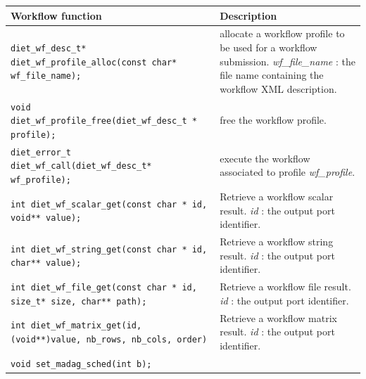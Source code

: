 \begin{table}[htbp]
  \centering
  \begin{tabular}[htbp]{|p{8cm}|p{7.5cm}|}\hline
    Workflow function & Description \\\hline
    \texttt{diet\_wf\_desc\_t*  \newline
      diet\_wf\_profile\_alloc(const char* wf\_file\_name);} 
    &
    allocate a workflow profile to be used for a workflow submission.\newline
    \textit{wf\_file\_name} : the file name containing the workflow XML description.
    \\\hline
    \texttt{void  \newline
      diet\_wf\_profile\_free(diet\_wf\_desc\_t * profile);} 
    &
    free the workflow profile.
    \\\hline
    \texttt{diet\_error\_t \newline
      diet\_wf\_call(diet\_wf\_desc\_t* wf\_profile);} 
    &
    execute the workflow associated to profile \textit{wf\_profile}.
    \\\hline
    \texttt{int   \newline
      diet\_wf\_scalar\_get(const char * id, void** value);} 
    &
    Retrieve a workflow scalar result. \newline
    \textit{id} : the output port identifier.
    \\\hline
    \texttt{int   \newline
      diet\_wf\_string\_get(const char * id, char** value);} 
    &
    Retrieve a workflow string result. \newline
    \textit{id} : the output port identifier.
    \\\hline
    \texttt{int    \newline
      diet\_wf\_file\_get(const char * id, size\_t* size, char** path);
    }
    &
    Retrieve a workflow file result. \newline
    \textit{id} : the output port identifier.
    \\\hline
    \texttt{int \newline
      diet\_wf\_matrix\_get(id, (void**)value, nb\_rows, nb\_cols, order)
    }
    &
    Retrieve a workflow matrix result. \newline
    \textit{id} : the output port identifier.
    \\\hline
    \texttt{void \newline
      set\_madag\_sched(int b);}&

\end{tabular}
\end{table}
